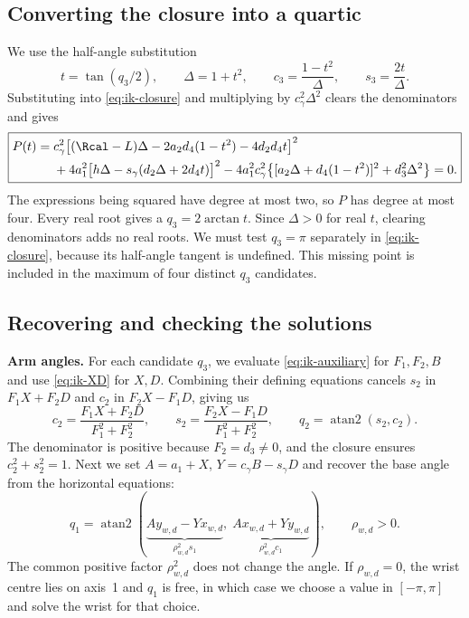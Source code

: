 \subsection{Converting the closure into a quartic}
\label{sec:ik-quartic}
We use the half-angle substitution
\begin{equation}
 t=\tan(q_3/2),\qquad \Delta=1+t^2,\qquad
 c_3=\frac{1-t^2}{\Delta},\qquad s_3=\frac{2t}{\Delta}.
 \label{eq:ik-half-angle}
\end{equation}
Substituting into \eqref{eq:ik-closure} and multiplying by
$c_\gamma^2\Delta^2$ clears the denominators and gives
\begin{equation}
 \boxed{\begin{aligned}
 P(t)={}&c_\gamma^2\bigl[(\Rcal-L)\Delta-2a_2d_4(1-t^2)-4d_2d_4t\bigr]^2\\
       &+4a_1^2\bigl[h\Delta-s_\gamma(d_2\Delta+2d_4t)\bigr]^2
       -4a_1^2c_\gamma^2\bigl\{[a_2\Delta+d_4(1-t^2)]^2+d_3^2\Delta^2\bigr\}=0.
 \end{aligned}}
 \label{eq:ik-quartic}
\end{equation}
The expressions being squared have degree at most two, so $P$ has degree at most four.
Every real root gives a $q_3=2\arctan t$. Since $\Delta>0$ for real $t$,
clearing denominators adds no real roots. We must test $q_3=\pi$ separately in
\eqref{eq:ik-closure}, because its half-angle tangent is undefined. This missing point is included in the maximum of four distinct $q_3$ candidates.

\subsection{Recovering and checking the solutions}
\label{sec:ik-orientation}
\textbf{Arm angles.}
For each candidate $q_3$, we evaluate \eqref{eq:ik-auxiliary} for $F_1,F_2,B$ and
use \eqref{eq:ik-XD} for $X,D$. Combining their defining equations cancels
$s_2$ in $F_1X+F_2D$ and $c_2$ in $F_2X-F_1D$, giving us
\begin{equation}
 c_2=\frac{F_1X+F_2D}{F_1^2+F_2^2},\qquad
 s_2=\frac{F_2X-F_1D}{F_1^2+F_2^2},\qquad
 q_2=\operatorname{atan2}(s_2,c_2).
 \label{eq:ik-q2}
\end{equation}
The denominator is positive because $F_2=d_3\ne0$, and the closure ensures
$c_2^2+s_2^2=1$. Next we set $A=a_1+X$, $Y=c_\gamma B-s_\gamma D$ and recover
the base angle from the horizontal equations:
\begin{equation}
 q_1=\operatorname{atan2}(\underbrace{Ay_{w,d}-Yx_{w,d}}_{\rho_{w,d}^2s_1},\;
           \underbrace{Ax_{w,d}+Yy_{w,d}}_{\rho_{w,d}^2c_1}),\qquad \rho_{w,d}>0.
 \label{eq:ik-q1}
\end{equation}
The common positive factor $\rho_{w,d}^2$ does not change the angle.
If $\rho_{w,d}=0$, the wrist centre lies on axis~1 and $q_1$ is free, in which case we
choose a value in $[-\pi,\pi]$ and solve the wrist for that choice.

